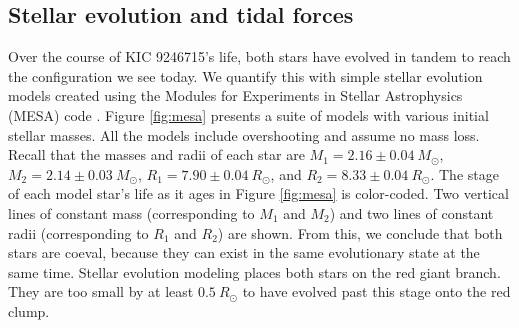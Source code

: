 \subsection{Stellar evolution and tidal forces}\label{tides}

Over the course of KIC 9246715's life, both stars have evolved in tandem to reach the configuration we see today. We quantify this with simple stellar evolution models created using the Modules for Experiments in Stellar Astrophysics (MESA) code \citep{pax11,pax13,pax15}. Figure \ref{fig:mesa} presents a suite of models with various initial stellar masses. All the models include overshooting and assume no mass loss. Recall that the masses and radii of each star are $M_1 = 2.16 \pm 0.04\ M_{\odot}$, $M_2 = 2.14 \pm 0.03\ M_{\odot}$, $R_1 = 7.90 \pm 0.04 \ R_{\odot}$, and $R_2 = 8.33 \pm 0.04 \ R_{\odot}$. The stage of each model star's life as it ages in Figure \ref{fig:mesa} is color-coded. Two vertical lines of constant mass (corresponding to $M_1$ and $M_2$) and two lines of constant radii (corresponding to $R_1$ and $R_2$) are shown. From this, we conclude that both stars are coeval, because they can exist in the same evolutionary state at the same time. Stellar evolution modeling places both stars on the red giant branch. They are too small by at least $0.5 \ R_\odot$ to have evolved past this stage onto the red clump.

